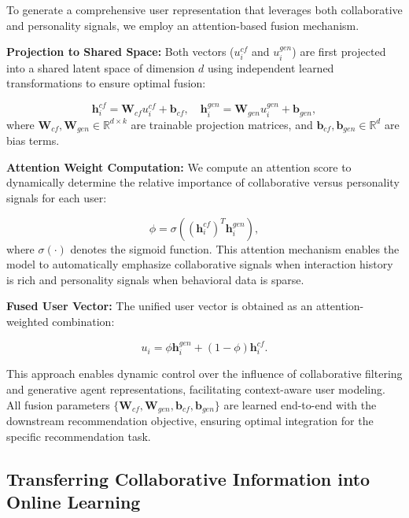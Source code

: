 \documentclass[acmsmall]{acmart}
\begin{document}
To generate a comprehensive user representation that leverages both collaborative and personality signals, we employ an attention-based fusion mechanism.

\textbf{Projection to Shared Space:} Both vectors ($u^{cf}_i$ and $u^{gen}_i$) are first projected into a shared latent space of dimension $d$ using independent learned transformations to ensure optimal fusion:

\begin{equation}
\mathbf{h}^{cf}_i = \mathbf{W}_{cf} u^{cf}_i + \mathbf{b}_{cf}, \quad \mathbf{h}^{gen}_i = \mathbf{W}_{gen} u^{gen}_i + \mathbf{b}_{gen},
\label{eq:projection_fusion}
\end{equation}
where $\mathbf{W}_{cf}, \mathbf{W}_{gen} \in \mathbb{R}^{d \times k}$ are trainable projection matrices, and $\mathbf{b}_{cf}, \mathbf{b}_{gen} \in \mathbb{R}^d$ are bias terms.

\textbf{Attention Weight Computation:} We compute an attention score to dynamically determine the relative importance of collaborative versus personality signals for each user:

\begin{equation}
\phi = \sigma\left((\mathbf{h}^{cf}_i)^T \mathbf{h}^{gen}_i\right),
\label{eq:attention_weight}
\end{equation}
where $\sigma(\cdot)$ denotes the sigmoid function. This attention mechanism enables the model to automatically emphasize collaborative signals when interaction history is rich and personality signals when behavioral data is sparse.

\textbf{Fused User Vector:} The unified user vector is obtained as an attention-weighted combination:

\begin{equation}
u_i = \phi \mathbf{h}^{gen}_i + (1 - \phi) \mathbf{h}^{cf}_i.
\label{eq:final_fusion}
\end{equation}

This approach enables dynamic control over the influence of collaborative filtering and generative agent representations, facilitating context-aware user modeling. All fusion parameters $\{\mathbf{W}_{cf}, \mathbf{W}_{gen}, \mathbf{b}_{cf}, \mathbf{b}_{gen}\}$ are learned end-to-end with the downstream recommendation objective, ensuring optimal integration for the specific recommendation task.

\subsection{Transferring Collaborative Information into Online Learning}
\label{sec:transfer_learning}
\end{document}
